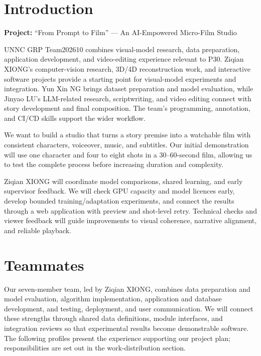 \documentclass[a4paper,12pt]{article}
\title{\BidTitle}
\author{\BidTeam}
\date{\BidDate}
\newcommand{\BidProjectName}{``From Prompt to Film'' --- An AI-Empowered Micro-Film Studio}
\begin{document}
\maketitle
\thispagestyle{plain}
\tableofcontents
\newpage

\section{Introduction}
\noindent\textbf{Project:} \BidProjectName
\par\medskip
UNNC GRP Team202610 combines visual-model research, data preparation, application development, and video-editing experience relevant to P30. Ziqian XIONG's computer-vision research, 3D/4D reconstruction work, and interactive software projects provide a starting point for visual-model experiments and integration. Yun Xin NG brings dataset preparation and model evaluation, while Jinyao LU's LLM-related research, scriptwriting, and video editing connect with story development and final composition. The team's programming, annotation, and CI/CD skills support the wider workflow.

We want to build a studio that turns a story premise into a watchable film with consistent characters, voiceover, music, and subtitles. Our initial demonstration will use one character and four to eight shots in a 30--60-second film, allowing us to test the complete process before increasing duration and complexity.

Ziqian XIONG will coordinate model comparisons, shared learning, and early supervisor feedback. We will check GPU capacity and model licences early, develop bounded training/adaptation experiments, and connect the results through a web application with preview and shot-level retry. Technical checks and viewer feedback will guide improvements to visual coherence, narrative alignment, and reliable playback.

\newpage
\section{Teammates}
Our seven-member team, led by Ziqian XIONG, combines data preparation and model evaluation, algorithm implementation, application and database development, and testing, deployment, and user communication. We will connect these strengths through shared data definitions, module interfaces, and integration reviews so that experimental results become demonstrable software. The following profiles present the experience supporting our project plan; responsibilities are set out in the work-distribution section.
\end{document}
